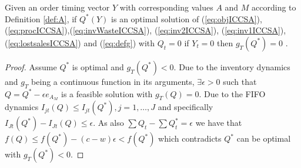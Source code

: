 \begin{lemma}
\label{lem:finalg}
Given an order timing vector $Y$ with corresponding values $A$ and $M$ according to Definition \ref{def:A}, if $Q^*(Y)$ is an optimal solution of (\ref{eq:objICCSA}),(\ref{eq:procICCSA}),(\ref{eq:invWasteICCSA}), (\ref{eq:inv2ICCSA}), (\ref{eq:inv1ICCSA}), (\ref{eq:lostsalesICCSA}) and (\ref{eq:defg}) with $Q_t= 0$ if $Y_t=0$ then $g_{T}(Q^*)=0$ .%
\end{lemma}
\begin{proof}
Assume $Q^ *$ is optimal and $g_{T}(Q^*)<0$. Due to the inventory dynamics and $g_T$ being a continuous function in its arguments, $\exists \epsilon>0$ such that $Q=Q^*-\epsilon e_{A_M}$ is a feasible solution with $g_{T}(Q)=0$. Due to the FIFO dynamics $I_{jt}(Q)\le I_{jt}(Q^*), j=1,\ldots,J$ and specifically $I_{Jt}(Q^*)-I_{Jt}(Q)\le \epsilon$. As also $\sum Q_t-\sum Q_t^* =\epsilon$ we have that $f(Q)\le f(Q^*)-(c-w)\epsilon < f(Q^*)$ which contradicts $Q^*$ can be optimal with $g_{T}(Q^*)<0$.  
\end{proof}



